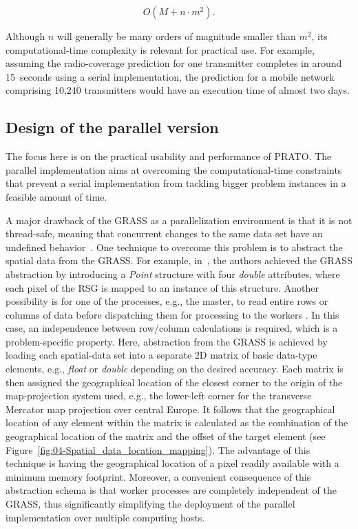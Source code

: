 \begin{equation}
O(M+n\cdot m^{2}).
\end{equation}


\noindent Although $n$ will generally be many orders of magnitude
smaller than $m^{2}$, its computational-time complexity is relevant
for practical use. For example, assuming the radio-coverage prediction
for one transmitter completes in around 15~seconds using a serial
implementation, the prediction for a mobile network comprising 10,240
transmitters would have an execution time of almost two days.


\subsection{Design of the parallel version \label{sub:04-Design_of_the_parallel_version}}

The focus here is on the practical usability and performance of PRATO.
The parallel implementation aims at overcoming the computational-time
constraints that prevent a serial implementation from tackling bigger
problem instances in a feasible amount of time.

A major drawback of the GRASS as a parallelization environment is
that it is not thread-safe, meaning that concurrent changes to the
same data set have an undefined behavior~\cite{Blazek_GRASS_server:2004}.
One technique to overcome this problem is to abstract the spatial
data from the GRASS. For example, in~\cite{Huang-Explorations_of_the_implementation_of_a_parallel_IDW_algorithm_in_a_Linux_cluster:2011},
the authors achieved the GRASS abstraction by introducing a \emph{Point
}structure with four \emph{double} attributes, where each pixel of
the RSG is mapped to an instance of this structure. Another possibility
is for one of the processes, e.g., the master, to read entire rows
or columns of data before dispatching them for processing to the workers
\cite{Akhter_Porting_GRASS_raster_module_to_distributed_computing:2007,Huang-Explorations_of_the_implementation_of_a_parallel_IDW_algorithm_in_a_Linux_cluster:2011}.
In this case, an independence between row/column calculations is required,
which is a problem-specific property. Here, abstraction from the GRASS
is achieved by loading each spatial-data set into a separate 2D matrix
of basic data-type elements, e.g., \emph{float} or \emph{double} depending
on the desired accuracy. Each matrix is then assigned the geographical
location of the closest corner to the origin of the map-projection
system used, e.g., the lower-left corner for the transverse Mercator
map projection over central Europe. It follows that the geographical
location of any element within the matrix is calculated as the combination
of the geographical location of the matrix and the offset of the target
element (see Figure~\ref{fig:04-Spatial_data_location_mapping}).
The advantage of this technique is having the geographical location
of a pixel readily available with a minimum memory footprint. Moreover,
a convenient consequence of this abstraction schema is that worker
processes are completely independent of the GRASS, thus significantly
simplifying the deployment of the parallel implementation over multiple
computing hosts.

